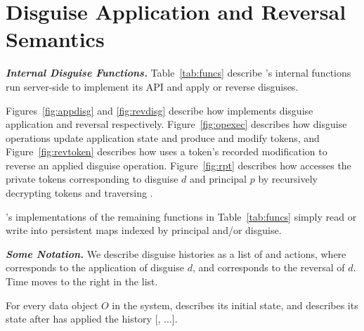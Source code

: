 \section{Disguise Application and Reversal Semantics}

\vspace{6pt}\noindent\textbf{\emph{Internal Disguise Functions.}}
Table~\ref{tab:funcs} describe \sys's internal functions run server-side to implement its API 
and apply or reverse disguises. 

Figures~\ref{fig:appdisg} and \ref{fig:revdisg} describe how \sys implements disguise application and
reversal respectively. Figure~\ref{fig:opexec} describes how disguise operations update application
state and produce and modify tokens, and 
Figure~\ref{fig:revtoken} describes how \sys uses a token's recorded
modification to reverse an applied disguise operation. 
Figure~\ref{fig:rpt} describes how \sys accesses the private tokens
corresponding to disguise $d$ and principal $p$ by recursively decrypting tokens and traversing
.

\sys's implementations of the remaining functions in Table~\ref{tab:funcs} simply read or write into
persistent maps indexed by principal and/or disguise.

\vspace{6pt}\noindent\textbf{\emph{Some Notation.}}
We describe disguise histories as a list of  and  actions, where  corresponds
to the application of disguise $d$, and  corresponds to the reversal of $d$. Time moves to
the right in the list.

For every data object $O$ in the system, \ostart describes its initial state, and
 describes its state after \sys has applied the history [,
$\dots$].

